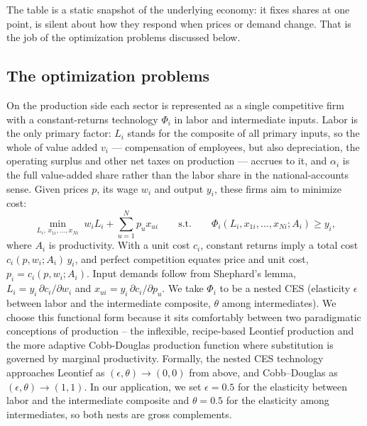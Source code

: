 The table is a static snapshot of the underlying economy: it fixes shares at one point, is silent about how they respond when prices or demand change. That is the job of the optimization problems discussed below.

\subsection{The optimization problems}\label{subsec:optimization}

On the production side each sector is represented as a single competitive firm with a constant-returns technology $\Phi_i$ in labor and intermediate inputs. Labor is the only primary factor: $L_i$ stands for the composite of all primary inputs, so the whole of value added $v_i$ --- compensation of employees, but also depreciation, the operating surplus and other net taxes on production --- accrues to it, and $\alpha_i$ is the full value-added share rather than the labor share in the national-accounts sense. Given prices $p$, its wage $w_i$ and output $y_i$, these firms aim to minimize cost:
\begin{equation}
\min_{L_i,\,x_{1i},\ldots,x_{Ni}} \; w_i L_i + \sum_{u=1}^N p_u x_{ui}
\qquad \text{s.t.} \qquad \Phi_i(L_i, x_{1i},\ldots,x_{Ni}; A_i) \geq y_i,
\label{eq:cost-min}
\end{equation}
where $A_i$ is productivity. With a unit cost $c_i$, constant returns imply a total cost
$c_i(p,w_i;A_i)\,y_i$, and perfect competition
equates price and unit cost, $p_i = c_i(p,w_i;A_i)$. Input demands follow
from Shephard's lemma, $L_i = y_i\,\partial c_i/\partial w_i$ and
$x_{ui} = y_i\,\partial c_i/\partial p_u$. 
We take $\Phi_i$ to be a nested CES (elasticity $\epsilon$ between labor and
the intermediate composite, $\theta$ among intermediates). We choose this functional form because it sits comfortably between two paradigmatic conceptions of production -- the inflexible, recipe-based Leontief production and the more adaptive Cobb-Douglas production function where substitution is governed by marginal productivity. Formally, the nested CES technology approaches Leontief as $(\epsilon,\theta)\to(0,0)$ from above, and Cobb--Douglas as $(\epsilon,\theta)\to(1,1)$.  In our application, we set $\epsilon = 0.5$ for the elasticity between labor and the intermediate composite and $\theta = 0.5$ for the elasticity among intermediates, so both nests are gross complements.

